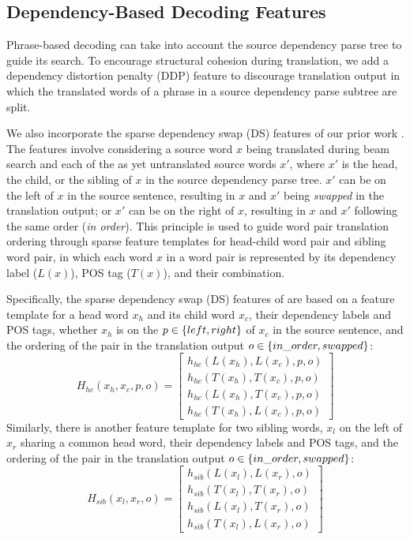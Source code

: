 \documentclass[letterpaper]{article}
\begin{document}
\subsection{Dependency-Based Decoding Features}

Phrase-based decoding can take into account the source dependency parse tree to guide its search. To encourage structural cohesion during translation, we add a dependency distortion penalty (DDP) feature \cite{cherry_cohesive_2008} to discourage translation output in which the translated words of a phrase in a source dependency parse subtree are split.

We also incorporate the sparse dependency swap (DS) features of our prior work \cite{hadiwinoto_swap_2016}. The features involve considering a source word $x$ being translated during beam search and each of the as yet untranslated source words $x'$, where $x'$ is the head, the child, or the sibling of $x$ in the source dependency parse tree. $x'$ can be on the left of $x$ in the source sentence, resulting in $x$ and $x'$ being \textit{swapped} in the translation output; or $x'$ can be on the right of $x$, resulting in $x$ and $x'$ following the same order (\textit{in order}). This principle is used to guide word pair translation ordering through sparse feature templates for head-child word pair and sibling word pair, in which each word $x$ in a word pair is represented by its dependency label ($L(x)$), POS tag ($T(x)$), and their combination.

Specifically, the sparse dependency swap (DS) features of \cite{hadiwinoto_swap_2016} are based on a feature template for a head word $x_h$ and its child word $x_c$, their dependency labels and POS tags, whether $x_h$ is on the $p\nolinebreak\in\nolinebreak\{left,right\}$ of $x_c$ in the source sentence, and the ordering of the pair in the translation output $o\nolinebreak\in\nolinebreak\{in\_order,swapped\}$:
\begin{equation}
H_{hc}(x_h,x_c,p,o) =
\left[\begin{array}{c}
h_{hc}(L(x_h),L(x_c),p,o) \\
h_{hc}(T(x_h),T(x_c),p,o) \\
h_{hc}(L(x_h),T(x_c),p,o) \\
h_{hc}(T(x_h),L(x_c),p,o)
\end{array}\right]
\label{eq:temp_parchild}
\end{equation}
Similarly, there is another feature template for two sibling words, $x_l$ on the left of $x_r$ sharing a common head word, their dependency labels and POS tags, and the ordering of the pair in the translation output $o\nolinebreak\in\nolinebreak\{in\_order,swapped\}$:
\begin{equation}
H_{sib}(x_l,x_r,o) =
\left[\begin{array}{c}
h_{sib}(L(x_l),L(x_r),o) \\
h_{sib}(T(x_l),T(x_r),o) \\
h_{sib}(L(x_l),T(x_r),o) \\
h_{sib}(T(x_l),L(x_r),o)
\end{array}\right]
\label{eq:temp_sibling}
\end{equation}
\end{document}

